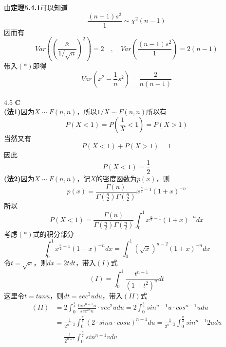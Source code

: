 \documentclass[a4paper]{ctexart}    %
\begin{document}
	由\textbf{定理5.4.1}可以知道
	\begin{equation*}
		\frac{(n-1)s^2}{1} \sim \chi^2(n-1)
	\end{equation*}
	因而有
	\begin{equation*}
		Var\left(\left(\frac{\bar{x}}{1/\sqrt{n}}\right)^2\right) = 2 \quad, \quad Var\left(\frac{(n-1)s^2}{1}\right) = 2(n-1)
	\end{equation*}
	带入$ (*) $即得
	\begin{equation*}
		Var\left(\bar{x}^2 - \frac{1}{n}s^2 \right) = \frac{2}{n(n-1)}
	\end{equation*}
	\\
	4.5 \quad \textbf{C} \\
	\textbf{(法1)}因为$X \sim F(n, n)$，所以$1/X \sim F(n, n)$所以有
	\begin{equation*}
		P(X<1) = P\left(\frac{1}{X} < 1\right) = P(X>1)
	\end{equation*}
	当然又有
	\begin{equation*}
		P(X<1) + P(X>1) = 1
	\end{equation*}
	因此
	\begin{equation*}
		P(X<1) = \frac12
	\end{equation*}
	\textbf{(法2)}因为$X \sim F(n, n)$，记$X$的密度函数为$p(x)$，则
	\begin{equation*}
		p(x) = \frac{\Gamma(n)}{\Gamma\left(\frac{n}{2}\right)\Gamma\left(\frac{n}{2}\right)} x^{\frac{n}{2}-1}(1+x)^{-n}
	\end{equation*}
	所以
	\begin{equation*}
		P(X<1) = \frac{\Gamma(n)}{\Gamma\left(\frac{n}{2}\right)\Gamma\left(\frac{n}{2}\right)} \int_{0}^{1} x^{\frac{n}{2}-1}(1+x)^{-n} dx\tag{$*$}
	\end{equation*}
	考虑$(*)$式的积分部分
	\begin{equation*}
		\int_{0}^{1} x^{\frac{n}{2}-1}(1+x)^{-n} dx = \int_{0}^{1} (\sqrt{x})^{n-2}(1+x)^{-n} dx \tag{$I$}
	\end{equation*}
	令$t=\sqrt{x}$，则$dx=2tdt$，带入$(I)$式
	\begin{equation*}
		(I) = \int_{0}^{1} \frac{t^{n-1} }{(1+t^2)^n} dt\tag{$ II $}
	\end{equation*}
	这里令$t=tanu$，则$dt=sec^2udu$，带入$(II)$式
	\begin{equation*}
		\begin{split}
			(II) &= 2\int_{0}^{\frac{\pi}{4}}\frac{tan^{n-1}u}{sec^{2n}u}\cdot sec^2udu = 2\int_{0}^{\frac{\pi}{4}}sin^{n-1}u \cdot cos^{n-1}u du \\
			&=\frac{1}{2^{n-2}}\int_{0}^{\frac{\pi}{4}}(2 \cdot sinu \cdot cosu)^{n-1}du = \frac{1}{2^{n-2}}\int_{0}^{\frac{\pi}{4}}sin^{n-1}2udu \\
			&= \frac{1}{2^{n-1}}\int_{0}^{\frac{\pi}{2}} sin^{n-1}vdv
		\end{split}
	\end{equation*}
\end{document}
